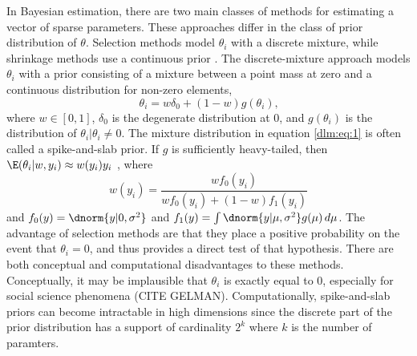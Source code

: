 In Bayesian estimation, there are two main classes of methods for estimating a vector of sparse parameters.
These approaches differ in the class of prior distribution of $\theta$. 
Selection methods model $\theta_{i}$ with a discrete mixture, while shrinkage methods use a continuous prior \parencite[73]{CarvalhoPolsonScott2009}. 
The discrete-mixture approach models $\theta_{i}$ with a prior consisting of a mixture between a point mass at zero and a continuous distribution for non-zero elements,
\begin{equation}
  \label{dlm:eq:1}
  \theta_{i} = w \delta_{0} +  (1 - w) g(\theta_{i}) \text{,}
\end{equation}
where $w \in [0, 1]$, $\delta_{0}$ is the degenerate distribution at 0, and $g(\theta_{i})$ is the distribution of $\theta_{i} | \theta_{i} \neq 0$.
The mixture distribution in equation \eqref{dlm:eq:1} is often called a spike-and-slab prior.
If $g$ is sufficiently heavy-tailed, then $\E(\theta_{i} | w, y_{i}) \approx w(y_{i}) y_{i}$ \parencite{PolsonScott2010}, where 
\begin{equation}
  \label{dlm:eq:7}
  w(y_{i})  = \frac{w f_{0}(y_{i})}{w f_{0}(y_{i}) + (1 - w) f_{1}(y_{i})}
\end{equation}
and $f_{0}(y) = \dnorm{y | 0, \sigma^{2}}$ and $f_{1}(y) = \int \dnorm{y | \mu, \sigma^{2}} g(\mu) \,d \mu$.
The advantage of selection methods are that they place a positive probability on the event that $\theta_{i} = 0$, and thus provides a direct test of that hypothesis.
There are both conceptual and computational disadvantages to these methods.
Conceptually, it may be implausible that $\theta_{i}$ is exactly equal to 0, especially for social science phenomena (CITE GELMAN).
Computationally, spike-and-slab priors can become intractable in high dimensions since the discrete part of the prior distribution has a support of cardinality $2^{k}$ where $k$ is the number of paramters.

